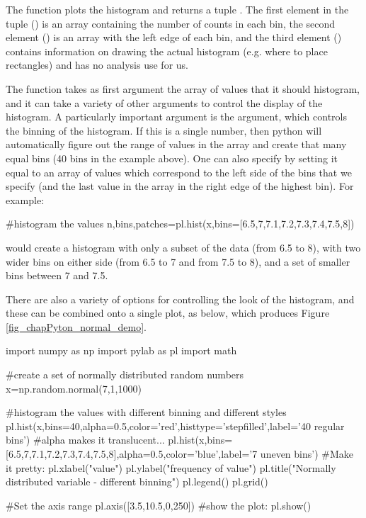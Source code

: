The  function plots the histogram and returns a tuple . The first element in the tuple () is an array containing the number of counts in each bin, the second element () is an array with the left edge of each bin, and the third element () contains information on drawing the actual histogram (e.g. where to place rectangles) and has no analysis use for us.

The  function takes as first argument the array of values that it should histogram, and it can take a variety of other arguments to control the display of the histogram. A particularly important argument is the  argument, which controls the binning of the histogram. If this is a single number, then python will automatically figure out the range of values in the array and create that many equal bins (40 bins in the example above). One can also specify  by setting it equal to an array of values which correspond to the left side of the bins that we specify (and the last value in the array in the right edge of the highest bin). For example:
\begin{python}[caption = \mbox{}]
#histogram the values
n,bins,patches=pl.hist(x,bins=[6.5,7,7.1,7.2,7.3,7.4,7.5,8])
\end{python}
would create a histogram with only a subset of the data (from 6.5 to 8), with two wider bins on either side (from 6.5 to 7 and from 7.5 to 8), and a set of smaller bins between 7 and 7.5.

There are also a variety of options for controlling the look of the histogram, and these can be combined onto a single plot, as below, which produces Figure \ref{fig_chapPyton_normal_demo}.
\begin{python}[caption = \mbox{}]
import numpy as np
import pylab as pl
import math 

#create a set of normally distributed random numbers
x=np.random.normal(7,1,1000)

#histogram the values with different binning and different styles
pl.hist(x,bins=40,alpha=0.5,color='red',histtype='stepfilled',label='40 regular bins') #alpha makes it translucent...
pl.hist(x,bins=[6.5,7,7.1,7.2,7.3,7.4,7.5,8],alpha=0.5,color='blue',label='7 uneven bins')
#Make it pretty:
pl.xlabel("value")
pl.ylabel("frequency of value")
pl.title("Normally distributed variable - different binning")
pl.legend()
pl.grid()

#Set the axis range
pl.axis([3.5,10.5,0,250])
#show the plot:
pl.show()
\end{python}

